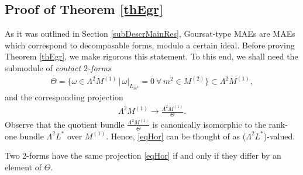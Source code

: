 \documentclass[10pt,a4paper]{amsart}
\numberwithin{equation}{section}
\begin{document}
\subsection{Proof of Theorem \ref{thEgr}}\label{subProofThEgr}

As it was outlined in Section \ref{subDescrMainRes}, Goursat-type MAEs are MAEs which correspond to decomposable forms, modulo a certain ideal. Before proving Theorem \ref{thEgr}, we make rigorous this statement. To this end, we shall need the submodule of \emph{contact $2$-forms}
\begin{gather}\label{defThetaGrande}
\Theta=\big\{\omega\in \Lambda^2 M^{(1)}\,|\,\omega|_{L_{m^2}}=0\ \forall\, m^2\in M^{(2)}\big\} \subset\Lambda^2 M^{(1)},
\end{gather}
and the corresponding projection
\begin{gather}\label{eqHor}
\Lambda^2 M^{(1)}\longrightarrow \frac{\Lambda^2 M^{(1)}}{\Theta}.
\end{gather}
Observe that the quotient bundle $ \frac{\Lambda^2 M^{(1)}}{\Theta}$ is canonically isomorphic to the rank-one bundle $\Lambda^2L^\ast$ over $M^{(1)}$. Hence, \eqref{eqHor} can be thought of as ($\Lambda^2L^\ast$)-valued.
\begin{Remark}\label{remarcoCheEraAddiritturaUnTheorema}
Two 2-forms have the same projection \eqref{eqHor} if and only if they dif\/fer by an element of $\Theta$.
\end{Remark}
\end{document}

